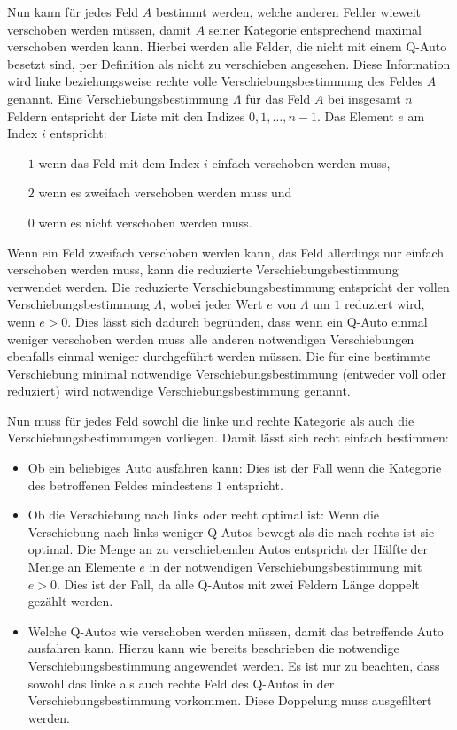 \documentclass[a4paper,10pt,ngerman]{scrartcl}
\begin{document}
Nun kann für jedes Feld $A$ bestimmt werden, welche anderen Felder wieweit verschoben werden müssen, damit $A$ seiner Kategorie entsprechend maximal verschoben werden kann.
Hierbei werden alle Felder, die nicht mit einem Q-Auto besetzt sind, per Definition als nicht zu verschieben angesehen.
Diese Information wird linke beziehungsweise rechte volle Verschiebungsbestimmung des Feldes $A$ genannt.
Eine Verschiebungsbestimmung $\Lambda$ für das Feld $A$ bei insgesamt $n$ Feldern entspricht der Liste mit den Indizes $0,1,\dots,n-1$.
Das Element $e$ am Index $i$ entspricht:
\begin{itemize}
    \item[$1$] wenn das Feld mit dem Index $i$ einfach verschoben werden muss,
    \item[$2$] wenn es zweifach verschoben werden muss und
    \item[$0$] wenn es nicht verschoben werden muss.
\end{itemize}

Wenn ein Feld zweifach verschoben werden kann, das Feld allerdings nur einfach verschoben werden muss, kann die reduzierte Verschiebungsbestimmung verwendet werden.
Die reduzierte Verschiebungsbestimmung entspricht der vollen Verschiebungsbestimmung $\Lambda$, wobei jeder Wert $e$ von $\Lambda$ um $1$ reduziert wird, wenn $e>0$.
Dies lässt sich dadurch begründen, dass wenn ein Q-Auto einmal weniger verschoben werden muss alle anderen notwendigen Verschiebungen ebenfalls einmal weniger durchgeführt werden müssen.
Die für eine bestimmte Verschiebung minimal notwendige Verschiebungsbestimmung (entweder voll oder reduziert) wird notwendige Verschiebungsbestimmung genannt.

\medskip
Nun muss für jedes Feld sowohl die linke und rechte Kategorie als auch die Verschiebungsbestimmungen vorliegen.
Damit lässt sich recht einfach bestimmen:
\begin{itemize}
    \item Ob ein beliebiges Auto ausfahren kann:
          Dies ist der Fall wenn die Kategorie des betroffenen Feldes mindestens $1$ entspricht.
    \item Ob die Verschiebung nach links oder recht optimal ist:
          Wenn die Verschiebung nach links weniger Q-Autos bewegt als die nach rechts ist sie optimal.
          Die Menge an zu verschiebenden Autos entspricht der Hälfte der Menge an Elemente $e$ in der notwendigen Verschiebungsbestimmung mit $e>0$.
          Dies ist der Fall, da alle Q-Autos mit zwei Feldern Länge doppelt gezählt werden.
    \item Welche Q-Autos wie verschoben werden müssen, damit das betreffende Auto ausfahren kann.
          Hierzu kann wie bereits beschrieben die notwendige Verschiebungsbestimmung angewendet werden.
          Es ist nur zu beachten, dass sowohl das linke als auch rechte Feld des Q-Autos in der Verschiebungsbestimmung vorkommen.
          Diese Doppelung muss ausgefiltert werden.
\end{itemize}
\end{document}
